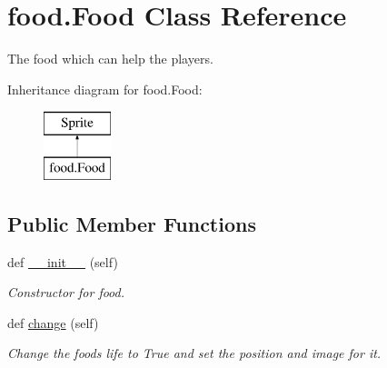 \hypertarget{classfood_1_1_food}{}\section{food.\+Food Class Reference}
\label{classfood_1_1_food}


The food which can help the players.  


Inheritance diagram for food.\+Food\+:\begin{figure}[H]
\begin{center}
\leavevmode
\includegraphics[height=2.000000cm]{classfood_1_1_food}
\end{center}
\end{figure}
\subsection*{Public Member Functions}
\begin{DoxyCompactItemize}
\item 
def \mbox{\hyperlink{classfood_1_1_food_ae050e5b3430466398fcf1673aeb7a786}{\+\_\+\+\_\+init\+\_\+\+\_\+}} (self)
\begin{DoxyCompactList}\small\item\em Constructor for food. \end{DoxyCompactList}\item 
def \mbox{\hyperlink{classfood_1_1_food_a01fb6317a45a2b55d164eed27df6c555}{change}} (self)
\begin{DoxyCompactList}\small\item\em Change the food\textquotesingle{}s life to True and set the position and image for it. \end{DoxyCompactList}\end{DoxyCompactItemize}

